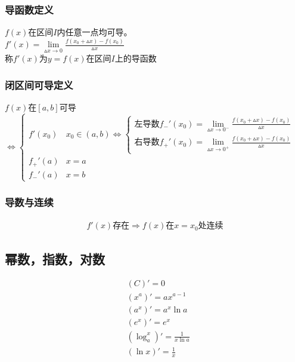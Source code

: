 \subsubsection{导函数定义}
$f(x)$在区间$I$内任意一点均可导。\\
$f'(x)=\lim\limits_{\vartriangle x\to 0}\frac{f(x_0+\vartriangle x)-f(x_0)}{\vartriangle x}$\\
称$f'(x)$为$y=f(x)$在区间$I$上的导函数
\subsubsection{闭区间可导定义}
$f(x)$在$[a,b]$可导$\Leftrightarrow\begin{cases}
  f'(x_0)  &x_0\in(a,b)\Leftrightarrow\begin{cases}
    \mbox{左导数}f_-'(x_0)=\lim\limits_{\vartriangle x\to 0^-}\frac{f(x_0+\vartriangle x)-f(x_0)}{\vartriangle x}\\
    \mbox{右导数}f_+'(x_0)=\lim\limits_{\vartriangle x\to 0^+}\frac{f(x_0+\vartriangle x)-f(x_0)}{\vartriangle x}
  \end{cases}\\
  f_+'(a) &x=a\\
  f_-'(a) &x=b
\end{cases}$
\subsubsection{导数与连续}
\begin{align}\label{derivative_continuity}
  f'(x)\mbox{存在}\Rightarrow f(x)\mbox{在}x=x_0\mbox{处连续}
\end{align}
\subsection{幂数，指数，对数}
\begin{align}
&(C)' = 0\label{derivative_1} \\
&(x^a)' = ax^{a-1} \label{derivative_2} \\
&(a^x)' = a^x\ln a \label{derivative_3}\\
&(e^x)' = e^x \label{derivative_4}\\
&(\log_a^x)' = \frac{1}{x\ln a} \label{derivative_5}\\
&(\ln{x})' = \frac{1}{x} \label{derivative_6}
\end{align}
